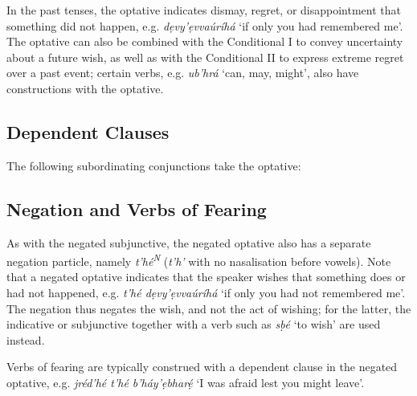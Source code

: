 \documentclass[a4paper, 12pt, twoside, openright, final]{book}
\newlength{\EnumItemSep} \EnumItemSep-3pt
\newenvironment { dlist } [1] [{}] {
    \vspace { -.5em }
    \begingroup
    \def\descriptionlabel ##1 {\hspace\labelsep \normalfont #1 ##1}
    \settowidth \leftmargini { 99.\hskip\labelsep }
    \begin { description }
    \itemsep \EnumItemSep
} {
    \end { description }
    \endgroup
    \vspace { -.5em }
}
\def \N {\textsuperscript{N}}
\let \w \textit
\begin{document}
In the past tenses, the optative indicates dismay, regret, or disappointment that something did not happen, e.g.
 \w{dẹvy’ẹvvaúríhá} ‘if only you had remembered me’. The optative can also be combined with the Conditional I
to convey uncertainty about a future wish, as well as with the Conditional II to express extreme regret over a past event;
certain verbs, e.g. \w{ub’hrá} ‘can, may, might’, also have constructions with the optative.

\subsection{Dependent Clauses}
The following subordinating conjunctions take the optative:

\subsection{Negation and Verbs of Fearing}\label{subsubsec:negated-optative}
As with the negated subjunctive, the negated optative also has a separate negation particle, namely \w{t’hé\N{}}
(\w{t’h’} with no nasalisation before vowels). Note that a negated optative indicates that the speaker wishes that something does
or had not happened, e.g. \w{t’hé dẹvy’ẹvvaúríhá} ‘if only you had not remembered me’. The negation thus negates
the wish, and not the act of wishing; for the latter, the indicative or subjunctive together with a verb such
as \w{sḅé} ‘to wish’ are used instead.

Verbs of fearing are typically construed with a dependent clause in the negated optative, e.g. \w{jréd’hé
t’hé b’háy’ẹbharẹ́} ‘I was afraid lest you might leave’.
\end{document}
